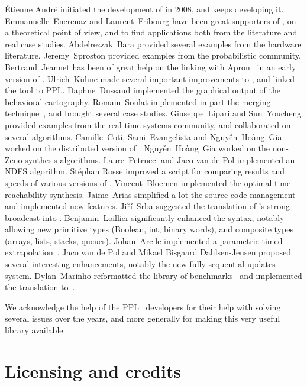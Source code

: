 \sloppy
\'Etienne André initiated the development of \imitator{} in 2008, and keeps developing it.
Emmanuelle~Encrenaz and Laurent~Fribourg have been great supporters of \imitator{}, on a theoretical point of view, and to find applications both from the literature and real case studies.
Abdelrezzak~Bara provided several examples from the hardware literature.
Jeremy~Sproston provided examples from the probabilistic community.
Bertrand~Jeannet has been of great help on the linking with Apron~\cite{JM09} in an early version of \imitator{}.
Ulrich~K\"uhne made several important improvements to \imitator{}, and linked the tool to PPL.
Daphne~Dussaud implemented the graphical output of the behavioral cartography.
Romain~Soulat implemented in part the merging technique~\cite{AFS13atva}, and brought several case studies.
Giuseppe~Lipari and Sun~Youcheng provided examples from the real-time systems community, and collaborated on several algorithms.
Camille~Coti, Sami~Evangelista and Nguy\~{ê}n~Hoàng~Gia worked on the distributed version of \imitator{}.
Nguy\~{ê}n~Hoàng~Gia worked on the non-Zeno synthesis algorithms.
Laure~Petrucci and Jaco van de Pol implemented an NDFS algorithm.
%
Stéphan Rosse improved a script for comparing results and speeds of various versions of \imitator{}.
%
Vincent~Bloemen implemented the optimal-time reachability synthesis.
%
Jaime~Arias simplified a lot the source code management and implemented new features.
%
Jiří~Srba suggested the translation of \imitator{}'s strong broadcast into \uppaal{}.
%
Benjamin~Loillier significantly enhanced the syntax, notably allowing new primitive types (Boolean, int, binary words), and composite types (arrays, lists, stacks, queues).
%
Johan~Arcile implemented a parametric timed extrapolation~\cite{AA22}.
%
Jaco van de Pol and Mikael Bisgaard Dahlsen-Jensen proposed several interesting enhancements, notably the new fully sequential updates system.
%
Dylan~Marinho reformatted the library of benchmarks~\cite{AMP21} and implemented the translation to~\jani{}.

We acknowledge the help of the PPL~\cite{BHZ08} developers for their help with solving several issues over the years, and more generally for making this very useful library available.




\chapter{Licensing and credits}

